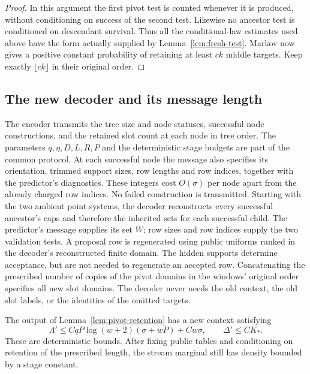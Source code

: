 \begin{proof}
In this argument the first pivot test is counted whenever it is
produced, without conditioning on success of the second test.
Likewise no ancestor test is conditioned on descendant survival.
Thus all the conditional-law estimates used above have the form
actually supplied by Lemma~\ref{lem:fresh-test}.
Markov now gives a positive constant probability of retaining at least
$c k$ middle targets.  Keep exactly $\lfloor c k\rfloor$ in their
original order.
\end{proof}

\subsection{The new decoder and its message length}

The encoder transmits the tree size and node statuses, successful node
constructions, and the retained slot count at each node in tree order.
The parameters $q,\eta,D,L,R,P$ and the deterministic stage budgets are
part of the common protocol.  At each successful node the message also
specifies its orientation, trimmed support sizes, row lengths and row
indices, together with the predictor's diagnostics.  These integers
cost $O(\sigma)$ per node apart from the already charged row indices.
No failed construction is transmitted.  Starting with the two ambient
point systems, the decoder reconstructs every successful ancestor's
caps and therefore the inherited sets for each successful child.
The predictor's message supplies its set $W$; row sizes and row indices
supply the two validation tests.  A proposal row is regenerated using
public uniforms ranked in the decoder's reconstructed finite domain.
The hidden supports determine acceptance, but are not needed to
regenerate an accepted row.  Concatenating the prescribed number
of copies of the pivot domains in the windows' original order specifies
all new slot domains.  The decoder never needs the old context, the old
slot labels, or the identities of the omitted targets.

\begin{lemma}\label{lem:pivot-compression}
The output of Lemma~\ref{lem:pivot-retention} has a new context satisfying
\begin{equation}\label{eq:stage-output}
 \Lambda'\le CqP\log(w+2)(\sigma+wP)+Cw\sigma,
 \qquad \Delta'\le CK_*.
\end{equation}
These are deterministic bounds.  After fixing public tables and
conditioning on retention of the prescribed length, the stream
marginal still has density bounded by a stage constant.
\end{lemma}

